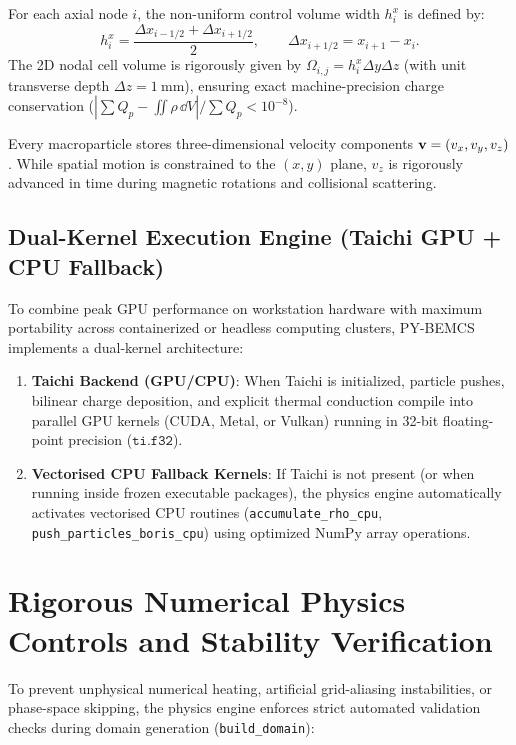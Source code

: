 \documentclass[11pt,a4paper]{article}
\newcommand{\PYBEMCS}{PY-BEMCS}
\begin{document}
For each axial node $i$, the non-uniform control volume width $h_i^x$ is defined by:
\begin{equation}
    h_i^x = \frac{\Delta x_{i-1/2} + \Delta x_{i+1/2}}{2}, \qquad \Delta x_{i+1/2} = x_{i+1} - x_i.
\end{equation}
The 2D nodal cell volume is rigorously given by $\Omega_{i,j} = h_i^x \Delta y \Delta z$ (with unit transverse depth $\Delta z = \SI{1}{\milli\meter}$), ensuring exact machine-precision charge conservation ($|\sum Q_p - \iint \rho\, \dd{V}| / \sum Q_p < 10^{-8}$).

Every macroparticle stores three-dimensional velocity components $\vb{v} = (v_x, v_y, v_z)$. While spatial motion is constrained to the $(x, y)$ plane, $v_z$ is rigorously advanced in time during magnetic rotations and collisional scattering.

\subsection{Dual-Kernel Execution Engine (Taichi GPU + CPU Fallback)}

To combine peak GPU performance on workstation hardware with maximum portability across containerized or headless computing clusters, \PYBEMCS{} implements a dual-kernel architecture:
\begin{enumerate}[nosep]
    \item \textbf{Taichi Backend (GPU/CPU)}: When Taichi is initialized, particle pushes, bilinear charge deposition, and explicit thermal conduction compile into parallel GPU kernels (CUDA, Metal, or Vulkan) running in 32-bit floating-point precision ($\texttt{ti.f32}$).
    \item \textbf{Vectorised CPU Fallback Kernels}: If Taichi is not present (or when running inside frozen executable packages), the physics engine automatically activates vectorised CPU routines (\texttt{accumulate\_rho\_cpu}, \texttt{push\_particles\_boris\_cpu}) using optimized NumPy array operations.
\end{enumerate}

\section{Rigorous Numerical Physics Controls and Stability Verification}

To prevent unphysical numerical heating, artificial grid-aliasing instabilities, or phase-space skipping, the physics engine enforces strict automated validation checks during domain generation (\texttt{build\_domain}):
\end{document}
